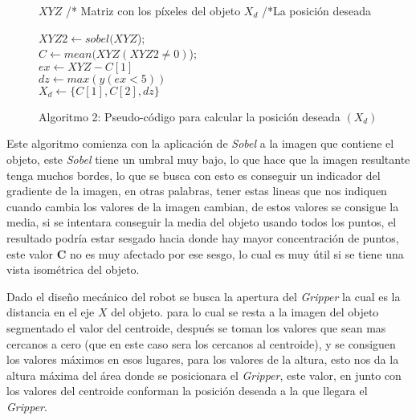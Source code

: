     
    \begin{figure}[h]
    	\begin{algorithmic}[h]
    		\REQUIRE $XYZ$ /* Matriz con los píxeles del objeto
    		\ENSURE	$X_d$	/*La posición deseada
    		
    		\STATE $XYZ2 \leftarrow sobel(XYZ$);\\
    		$C \leftarrow mean(XYZ(XYZ2\neq0)$);\\
    		\STATE $ex \leftarrow XYZ-C[1]$\\
    		$dz\leftarrow max(y(ex<5))$\\					
    		$X_d \leftarrow \{C[1], C[2], dz\}$
    	\end{algorithmic}
    	\caption{
    		Algoritmo 2: Pseudo-código para calcular la posición deseada $(X_d)$}
    	\label{alg2}
    \end{figure}
    
    Este algoritmo comienza con la aplicación de \textit{Sobel} a la imagen que contiene el objeto, este \textit{Sobel} tiene un umbral muy bajo, lo que hace que la imagen resultante tenga muchos bordes, lo que se busca con esto es conseguir un indicador del gradiente de la imagen, en otras palabras, tener estas lineas que nos indiquen cuando cambia los valores de la imagen cambian, de estos valores se consigue la media, si se intentara conseguir la media del objeto usando todos los puntos, el resultado podría estar sesgado hacia donde hay mayor concentración de puntos, este valor \textbf{C} no es muy afectado por ese sesgo, lo cual es muy útil si se tiene una vista isométrica del objeto.

    Dado el diseño mecánico del robot se busca la apertura del \textit{Gripper} la cual es la distancia en el eje $X$ del objeto. para lo cual se resta a la imagen del objeto segmentado el valor del centroide, después se toman los valores que sean mas cercanos a cero (que en este caso sera los cercanos al centroide), y  se consiguen los valores máximos en esos lugares, para los valores de la altura,  esto nos da la altura máxima del área donde se posicionara el \textit{Gripper}, este valor, en junto con los valores del centroide conforman la posición deseada a la que llegara el \textit{Gripper}.
    
